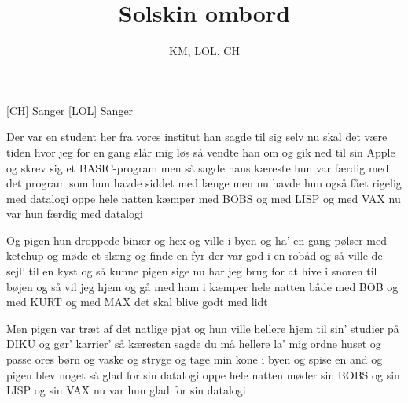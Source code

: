 \documentclass[a4paper,11pt]{article}
\title{Solskin ombord}
\author{KM, LOL, CH}
\begin{document}
\maketitle

\begin{roles}
[CH] Sanger
[LOL] Sanger
\end{roles}


\begin{song}
%
Der var en student her fra vores institut
han sagde til sig selv nu skal det være
tiden hvor jeg for en gang slår mig løs
så vendte han om og gik ned til sin
Apple og skrev sig et BASIC-program
men så sagde hans kæreste hun var færdig med
det program som hun havde siddet med længe
men nu havde hun også fået rigelig med
datalogi
oppe hele natten
kæmper med BOBS og med LISP og med VAX
nu var hun færdig med
datalogi

Og pigen hun droppede binær og hex
og ville i byen og ha' en gang
pølser med ketchup og møde et slæng
og finde en fyr der var god i en
robåd og så ville de sejl' til en kyst
og så kunne pigen sige nu har jeg
brug for at hive i snoren til bøjen
og så vil jeg hjem og gå med ham i
kæmper hele natten
både med BOB og med KURT og med MAX
det skal blive godt med lidt

Men pigen var træt af det natlige pjat
og hun ville hellere hjem til sin'
studier på DIKU og gør' karrier'
så kæresten sagde du må hellere la'
mig ordne huset og passe ores børn
og vaske og stryge og tage min
kone i byen og spise en and
og pigen blev noget så glad for sin
datalogi
oppe hele natten
møder sin BOBS og sin LISP og sin VAX
nu var hun glad for sin
datalogi
\end{song}
\end{document}
